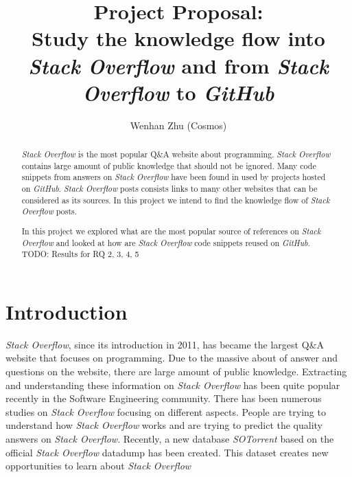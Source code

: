 \documentclass[sigconf]{acmart}
\begin{document}
\title{Project Proposal: \\ Study the knowledge flow into \textit{Stack Overflow} and from \textit{Stack Overflow} to \textit{GitHub}}

\author{Wenhan Zhu (Cosmos)}

\begin{abstract}

\textit{Stack Overflow} is the most popular Q\&A website about programming. \textit{Stack Overflow} contains large amount of public knowledge that should not be ignored. Many code snippets from answers on \textit{Stack Overflow} have been found in used by projects hosted on \textit{GitHub}. \textit{Stack Overflow} posts consists links to many other websites that can be considered as its sources. In this project we intend to find the knowledge flow of \textit{Stack Overflow} posts. 

In this project we explored what are the most popular source of references on \textit{Stack Overflow} and looked at how are \textit{Stack Overflow} code snippets reused on \textit{GitHub}. TODO: Results for RQ 2, 3, 4, 5

\end{abstract}


\maketitle

\section{Introduction}

\textit{Stack Overflow}, since its introduction in 2011, has became the largest Q\&A website that focuses on programming. Due to the massive about of answer and questions on the website, there are large amount of public knowledge. Extracting and understanding these information on \textit{Stack Overflow} has been quite popular recently in the Software Engineering community. There has been numerous studies on \textit{Stack Overflow} focusing on different aspects. People are trying to understand how \textit{Stack Overflow} works and are trying to predict the quality answers on \textit{Stack Overflow}. Recently, a new database \textit{SOTorrent} based on the official \textit{Stack Overflow} datadump has been created.\cite{Baltes:2018:SRA:3196398.3196430} This dataset creates new opportunities to learn about \textit{Stack Overflow}
\end{document}
